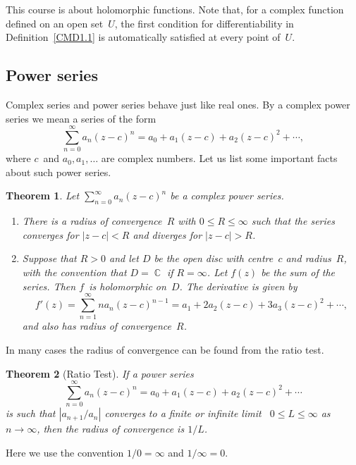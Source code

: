 \documentclass{amsproc}
\newtheorem{theorem}{Theorem}[subsection]
\theoremstyle{definition}
\theoremstyle{remark}
\DeclareMathOperator{\C}{\mathbb{C}}
\numberwithin{equation}{section}
\begin{document}
This course is about holomorphic functions. Note that, for a complex function defined on an open set~$ U $, the first condition for differentiability in
Definition~\ref{CMD1.1} is automatically satisfied at every point of~$ U $.


\vfill\pagebreak

\subsection{Power series} \label{CMS2}

Complex series and power series behave just like real ones. By a complex power series we mean a series of the form
$$
\sum_{n = 0}^\infty a_n(z-c)^n = a_0 + a_1(z-c) + a_2(z-c)^2 + \cdots,
$$
where $ c $~and $ a_0, a_1, \dots $ are complex numbers. Let us list some important facts about such power series.

\begin{theorem} \label{power}
Let $ \sum_{n = 0}^\infty a_n(z - c)^n $ be a complex power series.
\begin{enumerate}
\item  There is a radius of convergence~$ R $ with $ 0 \leq R \leq \infty $ such that the series converges
for $ |z - c| < R $ and diverges for $ |z - c| > R $.
\item Suppose that $ R > 0 $ and let $ D $ be the open disc with centre~$ c $ and radius~$ R $, with the convention that $ D = \C $ if $ R = \infty $.
Let $ f(z) $ be the sum of the series. Then $ f $~is holomorphic on~$ D $. The derivative is given by
$$
f'(z) = \sum_{n = 1}^\infty na_n(z-c)^{n-1} = a_1 + 2a_2(z-c) + 3a_3(z-c)^2 + \cdots,
$$
and also has radius of convergence~$ R $.
\end{enumerate}
\end{theorem}

In many cases the radius of convergence can be found from the ratio test.

\begin{theorem}[Ratio Test] \label{CMT2.2}
If a power series
$$
\sum_{n=0}^\infty a_n(z - c)^n = a_0 + a_1(z - c) + a_2(z - c)^2 + \cdots
$$
is such that $ |a_{n + 1}/a_n| $ converges to a finite or infinite limit~ $ 0 \leq L \leq \infty $ as $ n \to \infty $, then the radius of convergence is $ 1/L $.
\end{theorem}

Here we use the convention $ 1/0 = \infty $ and $ 1/\infty = 0 $.
\end{document}
